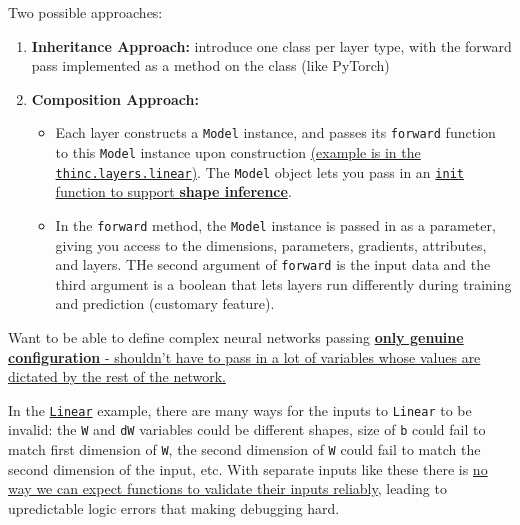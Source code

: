 \documentclass[
]{article}
\providecommand{\tightlist}{%
  \setlength{\itemsep}{0pt}\setlength{\parskip}{0pt}}
\begin{document}
Two possible approaches:

\begin{enumerate}
\def\labelenumi{\arabic{enumi}.}
\tightlist
\item
  \textbf{Inheritance Approach:} introduce one class per layer type,
  with the forward pass implemented as a method on the class (like
  PyTorch)
\item
  \textbf{Composition Approach:}

  \begin{itemize}
  \tightlist
  \item
    Each layer constructs a \texttt{Model} instance, and
    passes its \texttt{forward} function to this
    \texttt{Model} instance upon construction
    \href{https://hyp.is/-ceWpn7rEeqqmEdE6eVieg/thinc.ai/docs/api-layers}{(example
    is in the \texttt{thinc.layers.linear})}. The
    \texttt{Model} object lets you pass in an
    \href{https://hyp.is/bPmnGH7sEeqgGAMHdNcZBw/thinc.ai/docs/concept}{\texttt{init}
    function to support \textbf{shape inference}}.
  \item
    In the \texttt{forward} method, the
    \texttt{Model} instance is passed in as a parameter,
    giving you access to the dimensions, parameters, gradients,
    attributes, and layers. THe second argument of
    \texttt{forward} is the input data and the third
    argument is a boolean that lets layers run differently during
    training and prediction (customary feature).
  \end{itemize}
\end{enumerate}

Want to be able to define complex neural networks passing
\href{https://hyp.is/fjUbCE5OEeqhWS9aPoAuWA/thinc.ai/docs/concept}{\textbf{only
genuine configuration} - shouldn't have to pass in a lot of variables
whose values are dictated by the rest of the network.}

In the
\href{https://hyp.is/-ceWpn7rEeqqmEdE6eVieg/thinc.ai/docs/api-layers}{\texttt{Linear}}
example, there are many ways for the inputs to
\texttt{Linear} to be invalid: the
\texttt{W} and \texttt{dW} variables could
be different shapes, size of \texttt{b} could fail to
match first dimension of \texttt{W}, the second dimension
of \texttt{W} could fail to match the second dimension of
the input, etc. With separate inputs like these there is
\href{https://hyp.is/IiqFkHv-EeqFqTdLTRzgfQ/thinc.ai/docs/concept}{no
way we can expect functions to validate their inputs reliably}, leading
to upredictable logic errors that making debugging hard.
\end{document}

